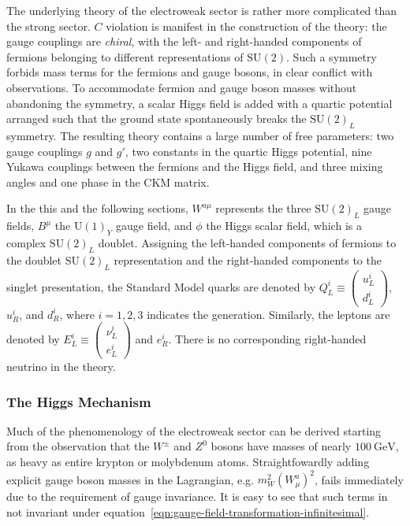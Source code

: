 The underlying theory of the electroweak sector is rather more complicated than the strong sector. $C$ violation is manifest in the construction of the theory: the gauge couplings are \emph{chiral}, with the left- and right-handed components of fermions belonging to different representations of $\mathrm{SU}(2)$. Such a symmetry forbids mass terms for the fermions and gauge bosons, in clear conflict with observations. To accommodate fermion and gauge boson masses without abandoning the symmetry, a scalar Higgs field is added with a quartic potential arranged such that the ground state spontaneously breaks the $\mathrm{SU}(2)_L$ symmetry. The resulting theory contains a large number of free parameters: two gauge couplings $g$ and $g'$, two constants in the quartic Higgs potential, nine Yukawa couplings between the fermions and the Higgs field, and three mixing angles and one phase in the CKM matrix. 


In the this and the following sections, $W^{a\mu}$ represents the three $\mathrm{SU}(2)_L$ gauge fields, $B^{\mu}$ the $\mathrm{U}(1)_Y$ gauge field, and $\phi$ the Higgs scalar field, which is a complex $\mathrm{SU}(2)_L$ doublet. Assigning the left-handed components of fermions to the doublet $\mathrm{SU}(2)_L$ representation and the right-handed components to the singlet presentation, the Standard Model quarks are denoted by $Q_L^i\equiv \left(\begin{array}{c} u^i_L \\ d^i_L \end{array}\right)$, $u_R^i$, and $d_R^i$, where $i=1,2,3$ indicates the generation. Similarly, the leptons are denoted by $E_L^i\equiv \left(\begin{array}{c} \nu_L^i \\ e_L^i \end{array}\right)$ and $e_R^i$. There is no corresponding right-handed neutrino in the theory. 

\subsubsection{The Higgs Mechanism}\label{sec:higgs-mechanism}
Much of the phenomenology of the electroweak sector can be derived starting from the observation that the $W^{\pm}$ and $Z^0$ bosons have masses of nearly $\SI{100}{\giga\electronvolt}$, as heavy as entire krypton or molybdenum atoms. Straightfowardly adding explicit gauge boson masses in the Lagrangian, e.g. $m_W^2 (W_{\mu}^a)^2$, fails immediately  due to the requirement of gauge invariance. It is easy to see that such terms in not invariant under equation~\ref{eqn:gauge-field-transformation-infinitesimal}.

